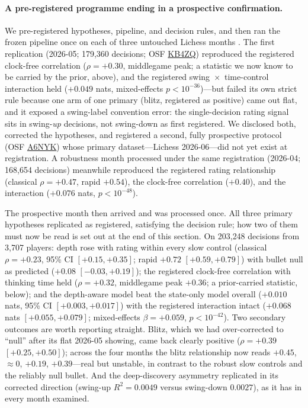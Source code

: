\paragraph{A pre-registered programme ending in a prospective confirmation.}
We pre-registered hypotheses, pipeline, and decision rules, and then ran the frozen pipeline
once on each of three untouched Lichess months \citep{nosek2018}. The first replication
(2026-05; 179{,}360 decisions; OSF \href{https://doi.org/10.17605/OSF.IO/KB4ZQ}{KB4ZQ})
reproduced the registered clock-free correlation ($\rho=+0.30$, middlegame peak; a
statistic we now know to be carried by the prior, above), and the registered swing~$\times$~time-control interaction held ($+0.049$
nats, mixed-effects $p<10^{-36}$)---but failed its own strict rule because one arm of one
primary (blitz, registered as positive) came out flat, and it exposed a swing-label
convention error: the single-decision rating signal sits in swing-\emph{up} decisions, not
swing-down as first registered. We disclosed both, corrected the hypotheses, and registered a
second, fully prospective protocol (OSF \href{https://doi.org/10.17605/OSF.IO/A6NYK}{A6NYK})
whose primary dataset---Lichess 2026-06---did not yet exist at registration. A robustness
month processed under the same registration (2026-04; 168{,}654 decisions) meanwhile
reproduced the registered rating relationship (classical $\rho=+0.47$, rapid $+0.54$), the
clock-free correlation ($+0.40$), and the interaction ($+0.076$ nats, $p<10^{-48}$).

The prospective month then arrived and was processed once. All three primary hypotheses
replicated as registered, satisfying the decision rule; how two of them must now be read is
set out at the end of this section. On 203{,}248 decisions from 3{,}707
players: depth rose with rating within every slow control (classical $\rho=+0.23$, 95\% CI
$[+0.15,+0.35]$; rapid $+0.72$ $[+0.59,+0.79]$) with bullet null as predicted ($+0.08$
$[-0.03,+0.19]$); the registered clock-free correlation with thinking time held ($\rho=+0.32$,
middlegame peak $+0.36$; a prior-carried statistic, below); and the depth-aware model beat the state-only model overall ($+0.010$ nats,
95\% CI $[+0.003,+0.017]$) with the registered interaction intact ($+0.068$ nats
$[+0.055,+0.079]$; mixed-effects $\beta=+0.059$, $p<10^{-42}$). Two secondary outcomes are
worth reporting straight. Blitz, which we had over-corrected to ``null'' after its flat 2026-05
showing, came back clearly positive ($\rho=+0.39$ $[+0.25,+0.50]$); across the four months the
blitz relationship now reads $+0.45$, $\approx0$, $+0.19$, $+0.39$---real but unstable, in
contrast to the robust slow controls and the reliably null bullet. And the deep-discovery
asymmetry replicated in its corrected direction (swing-up $R^2=0.0049$ versus swing-down
$0.0027$), as it has in every month examined.

